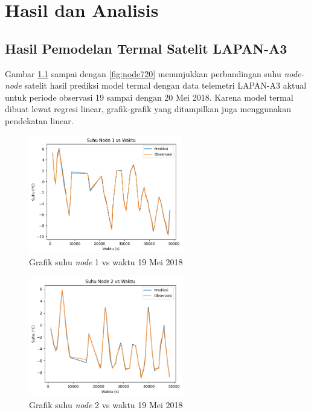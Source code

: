 \chapter{Hasil dan Analisis}

\section{Hasil Pemodelan Termal Satelit LAPAN-A3}

Gambar \ref{fig:node119} sampai dengan \ref{fig:node720} menunjukkan
perbandingan suhu \textit{node-node} satelit hasil prediksi model termal dengan
data telemetri LAPAN-A3 aktual untuk periode observasi 19 sampai dengan 20 Mei
2018. Karena model termal dibuat lewat regresi linear, grafik-grafik yang
ditampilkan juga menggunakan pendekatan linear.

\begin{figure}[H]
\setlength{}
\begin{center}
\includegraphics[width=0.6\textwidth]{fig/node1_temp_2018-05-19.png}
	\caption{Grafik suhu \textit{node} 1 vs waktu 19 Mei 2018}
\label{fig:node119}
\end{center}
\end{figure}

\begin{figure}[H]
\setlength{}
\begin{center}
\includegraphics[width=0.6\textwidth]{fig/node2_temp_2018-05-19.png}
	\caption{Grafik suhu \textit{node} 2 vs waktu 19 Mei 2018}
\label{fig:node219}
\end{center}
\end{figure}

